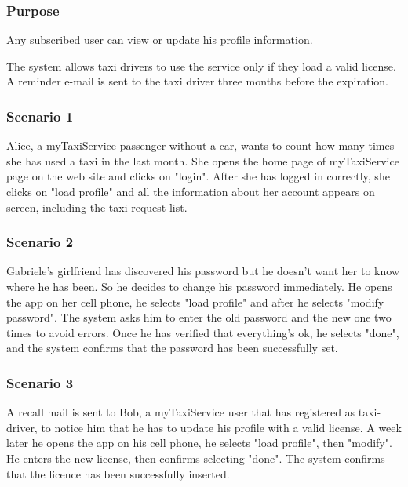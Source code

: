 \label{user-profile}
\subsubsection{Purpose}
Any subscribed user can view or update his profile information. 

The system allows taxi drivers to use the service only if they load a valid license. A reminder e-mail is sent to the taxi driver three months before the expiration. 


\subsubsection{Scenario 1}
Alice, a myTaxiService passenger without a car, wants to count how many times she has used a taxi in the last month.
She opens the home page of myTaxiService page on the web site and clicks on "login". 
After she has logged in correctly, she clicks on "load profile" and all the information about her account appears on screen, including the taxi request list. 

\subsubsection{Scenario 2}
Gabriele's girlfriend has discovered his password but he doesn't want her to know where he has been. So he decides to change his password immediately. He opens the app on her cell phone, he selects "load profile" and after he selects "modify password". The system asks him to enter the old password and the new one two times to avoid errors. Once he has verified that everything's ok, he selects "done", and the system confirms that the password has been successfully set.

\subsubsection{Scenario 3}
A recall mail is sent to Bob, a myTaxiService user that has registered as taxi-driver, to notice him that he has to update his profile with a valid license. A week later he opens the app on his cell phone, he selects "load profile", then "modify". He enters the new license, then confirms selecting "done". The system confirms that the licence has been successfully inserted.

